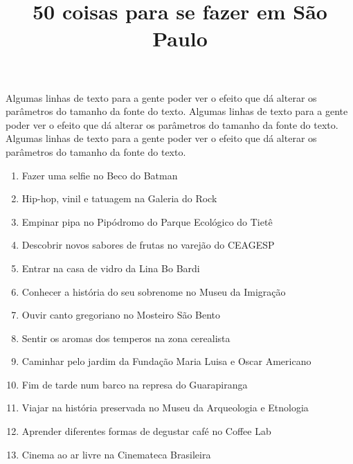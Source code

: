 \documentclass[extrafontsizes,14pt]{memoir}
\title{50 coisas para se fazer em São Paulo}
\date {}
\begin{document}
%
%
\fontsize{20pt}{24pt}\selectfont

\maketitle


Algumas linhas de texto
para a gente poder ver o
efeito que dá alterar
os parâmetros do tamanho
da fonte do texto. Algumas linhas de texto
para a gente poder ver o
efeito que dá alterar
os parâmetros do tamanho
da fonte do texto. Algumas linhas de texto
para a gente poder ver o
efeito que dá alterar
os parâmetros do tamanho
da fonte do texto.





\begin{enumerate}

\item Fazer uma selfie no Beco do Batman

\item Hip-hop, vinil e tatuagem na Galeria do Rock

\item Empinar pipa no Pipódromo do Parque Ecológico do Tietê
 
\item Descobrir novos sabores de frutas no varejão do CEAGESP

\item Entrar na casa de vidro da Lina Bo Bardi

\item Conhecer a história do seu sobrenome no Museu da Imigração

\item Ouvir canto gregoriano no Mosteiro São Bento

\item Sentir os aromas dos temperos na zona cerealista

\item Caminhar pelo jardim da Fundação Maria Luisa e Oscar Americano

\item Fim de tarde num barco na represa do  Guarapiranga

\item Viajar na história preservada no Museu da Arqueologia e Etnologia

\item Aprender diferentes formas de degustar café no Coffee Lab

\item Cinema ao ar livre na Cinemateca Brasileira


\end{enumerate}
\end{document}
